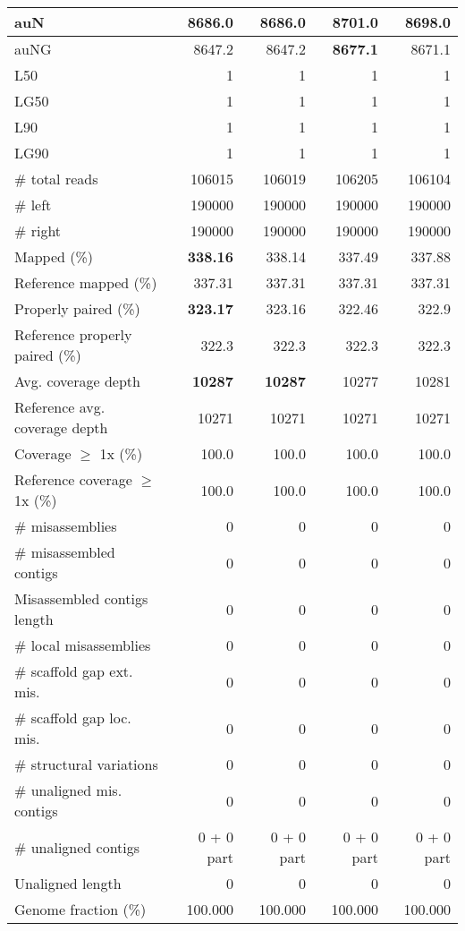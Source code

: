 \documentclass[12pt,a4paper]{article}
\begin{document}
\begin{table}[ht]
\begin{center}
\begin{tabular}{|l*{4}{|r}|}
auN & 8686.0 & 8686.0 & {\bf 8701.0} & 8698.0 \\ \hline
auNG & 8647.2 & 8647.2 & {\bf 8677.1} & 8671.1 \\ \hline
L50 & 1 & 1 & 1 & 1 \\ \hline
LG50 & 1 & 1 & 1 & 1 \\ \hline
L90 & 1 & 1 & 1 & 1 \\ \hline
LG90 & 1 & 1 & 1 & 1 \\ \hline
\# total reads & 106015 & 106019 & 106205 & 106104 \\ \hline
\# left & 190000 & 190000 & 190000 & 190000 \\ \hline
\# right & 190000 & 190000 & 190000 & 190000 \\ \hline
Mapped (\%) & {\bf 338.16} & 338.14 & 337.49 & 337.88 \\ \hline
Reference mapped (\%) & 337.31 & 337.31 & 337.31 & 337.31 \\ \hline
Properly paired (\%) & {\bf 323.17} & 323.16 & 322.46 & 322.9 \\ \hline
Reference properly paired (\%) & 322.3 & 322.3 & 322.3 & 322.3 \\ \hline
Avg. coverage depth & {\bf 10287} & {\bf 10287} & 10277 & 10281 \\ \hline
Reference avg. coverage depth & 10271 & 10271 & 10271 & 10271 \\ \hline
Coverage $\geq$ 1x (\%) & 100.0 & 100.0 & 100.0 & 100.0 \\ \hline
Reference coverage $\geq$ 1x (\%) & 100.0 & 100.0 & 100.0 & 100.0 \\ \hline
\# misassemblies & 0 & 0 & 0 & 0 \\ \hline
\# misassembled contigs & 0 & 0 & 0 & 0 \\ \hline
Misassembled contigs length & 0 & 0 & 0 & 0 \\ \hline
\# local misassemblies & 0 & 0 & 0 & 0 \\ \hline
\# scaffold gap ext. mis. & 0 & 0 & 0 & 0 \\ \hline
\# scaffold gap loc. mis. & 0 & 0 & 0 & 0 \\ \hline
\# structural variations & 0 & 0 & 0 & 0 \\ \hline
\# unaligned mis. contigs & 0 & 0 & 0 & 0 \\ \hline
\# unaligned contigs & 0 + 0 part & 0 + 0 part & 0 + 0 part & 0 + 0 part \\ \hline
Unaligned length & 0 & 0 & 0 & 0 \\ \hline
Genome fraction (\%) & 100.000 & 100.000 & 100.000 & 100.000 \\ \hline

\end{tabular}
\end{center}
\end{table}
\end{document}
